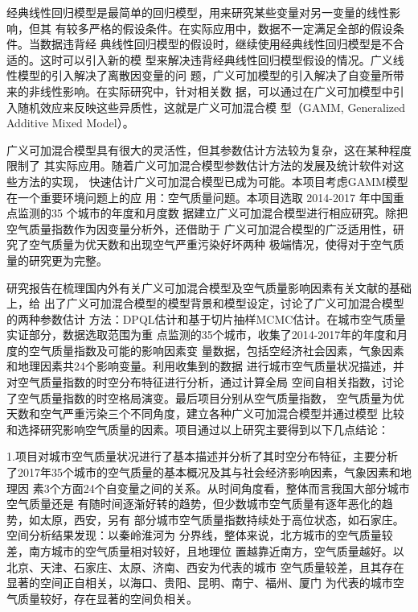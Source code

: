 ﻿\begin{cabstract}
  \renewcommand{\chapterlabel}{摘\hspace{2em}要}

  经典线性回归模型是最简单的回归模型，用来研究某些变量对另一变量的线性影响，但其
  有较多严格的假设条件。在实际应用中，数据不一定满足全部的假设条件。当数据违背经
  典线性回归模型的假设时，继续使用经典线性回归模型是不合适的。这时可以引入新的模
  型来解决违背经典线性回归模型假设的情况。广义线性模型的引入解决了离散因变量的问
  题，广义可加模型的引入解决了自变量所带来的非线性影响。在实际研究中，针对相关数
  据，可以通过在广义可加模型中引入随机效应来反映这些异质性，这就是广义可加混合模
  型（GAMM, Generalized Additive Mixed Model）。
  
  广义可加混合模型具有很大的灵活性，但其参数估计方法较为复杂，这在某种程度限制了
  其实际应用。随着广义可加混合模型参数估计方法的发展及统计软件对这些方法的实现，
  快速估计广义可加混合模型已成为可能。本项目考虑GAMM模型在一个重要环境问题上的应
  用：空气质量问题。本项目选取 2014-2017 年中国重点监测的35 个城市的年度和月度数
  据建立广义可加混合模型进行相应研究。除把空气质量指数作为因变量分析外，还借助于
  广义可加混合模型的广泛适用性，研究了空气质量为优天数和出现空气严重污染好坏两种
  极端情况，使得对于空气质量的研究更为完整。
  
  研究报告在梳理国内外有关广义可加混合模型及空气质量影响因素有关文献的基础上，给
  出了广义可加混合模型的模型背景和模型设定，讨论了广义可加混合模型的两种参数估计
  方法：DPQL估计和基于切片抽样MCMC估计。在城市空气质量实证部分，数据选取范围为重
  点监测的35个城市，收集了2014-2017年的年度和月度的空气质量指数及可能的影响因素变
  量数据，包括空经济社会因素，气象因素和地理因素共24个影响变量。利用收集到的数据
  进行城市空气质量状况描述，并对空气质量指数的时空分布特征进行分析，通过计算全局
  空间自相关指数，讨论了空气质量指数的时空格局演变。最后项目分别从空气质量指数，
  空气质量为优天数和空气严重污染三个不同角度，建立各种广义可加混合模型并通过模型
  比较和选择研究影响空气质量的因素。项目通过以上研究主要得到以下几点结论：
  
  1.项目对城市空气质量状况进行了基本描述并分析了其时空分布特征，主要分析
  了2017年35个城市的空气质量的基本概况及其与社会经济影响因素，气象因素和地理因
  素3个方面24个自变量之间的关系。从时间角度看，整体而言我国大部分城市空气质量还是
  有随时间逐渐好转的趋势，但少数城市空气质量有逐年恶化的趋势，如太原，西安，另有
  部分城市空气质量指数持续处于高位状态，如石家庄。空间分析结果发现：以秦岭淮河为
  分界线，整体来说，北方城市的空气质量较差，南方城市的空气质量相对较好，且地理位
  置越靠近南方，空气质量越好。以北京、天津、石家庄、太原、济南、西安为代表的城市
  空气质量较差，且其存在显著的空间正自相关，以海口、贵阳、昆明、南宁、福州、厦门
  为代表的城市空气质量较好，存在显著的空间负相关。
  

\end{cabstract}
